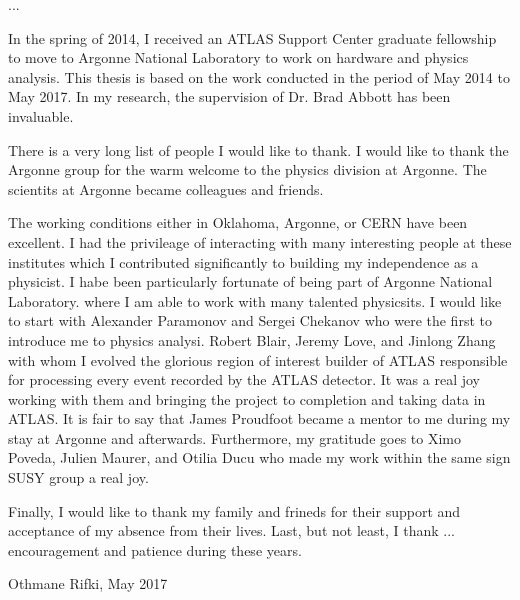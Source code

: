 ...

In the spring of 2014, I received an ATLAS Support Center graduate fellowship to move to Argonne National Laboratory 
to work on hardware and physics analysis.
This thesis is based on the work conducted in the period of May 2014 to May 2017. 
In my research, the supervision of Dr. Brad Abbott has been invaluable. 


There is a very long list of people I would like to thank. 
I would like to thank the Argonne group for the warm welcome to the physics division at Argonne.
The scientits at Argonne became colleagues and friends. 

The working conditions either in Oklahoma, Argonne, or CERN have been excellent. 
I had the privileage of interacting with many interesting people at these institutes which I contributed 
significantly to building my independence as a physicist. 
I habe been particularly fortunate of being part of Argonne National Laboratory.
where I am able to work with many talented physicsits. 
I would like to start with Alexander Paramonov and Sergei Chekanov who were the first to introduce me to physics analysi.
Robert Blair, Jeremy Love, and Jinlong Zhang with whom I evolved the glorious region of interest builder of ATLAS 
responsible for processing every event recorded by the ATLAS detector. 
It was a real joy working with them and bringing the project to completion and taking data in ATLAS.
It is fair to say that James Proudfoot became a mentor to me during my stay at Argonne and afterwards.
Furthermore, my gratitude goes to Ximo Poveda, Julien Maurer, and Otilia Ducu who made my work within the same sign SUSY 
group a real joy.

Finally, I would like to thank my family and frineds for their support and acceptance of my absence from their lives.
Last, but not least, I thank ... encouragement and patience during these years. 


Othmane Rifki, May 2017
